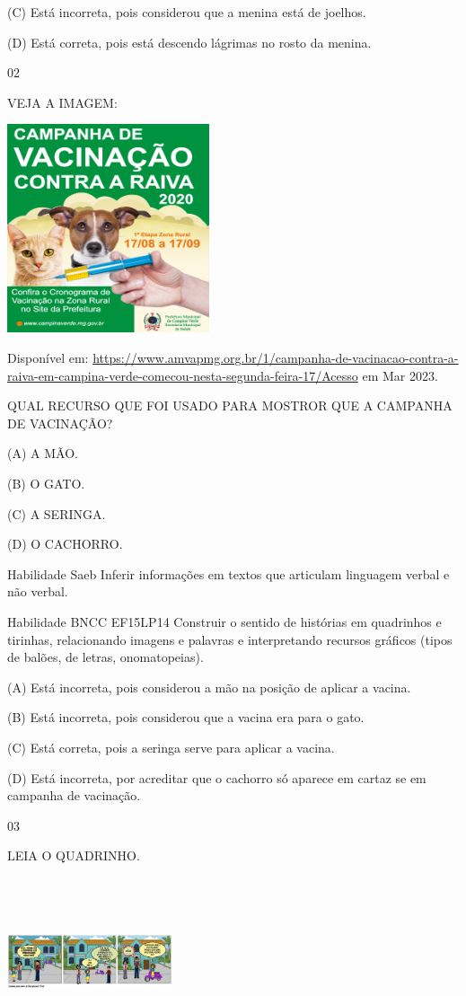 {{(C) Está incorreta, pois considerou que a menina está de joelhos.

(D) Está correta, pois está descendo lágrimas no rosto da menina.

\num{02}

VEJA A IMAGEM:

\includegraphics[width=2.34507in,height=2.41801in]{media/image137.png}

Disponível em:
\url{https://www.amvapmg.org.br/1/campanha-de-vacinacao-contra-a-raiva-em-campina-verde-comecou-nesta-segunda-feira-17/Acesso}
em Mar 2023.

QUAL RECURSO QUE FOI USADO PARA MOSTROR QUE A CAMPANHA DE VACINAÇÃO?

(A) A MÃO.

(B) O GATO.

(C) A SERINGA.

(D) O CACHORRO.

Habilidade Saeb Inferir informações em textos que articulam linguagem
verbal e não verbal.

Habilidade BNCC EF15LP14 Construir o sentido de histórias em quadrinhos
e tirinhas, relacionando imagens e palavras e interpretando recursos
gráficos (tipos de balões, de letras, onomatopeias).

(A) Está incorreta, pois considerou a mão na posição de aplicar a
vacina.

(B) Está incorreta, pois considerou que a vacina era para o gato.

(C) Está correta, pois a seringa serve para aplicar a vacina.

(D) Está incorreta, por acreditar que o cachorro só aparece em cartaz se
em campanha de vacinação.

\num{03}

LEIA O QUADRINHO.

\includegraphics[width=1.92014in,height=1.95486in]{media/image138.png}

}}
